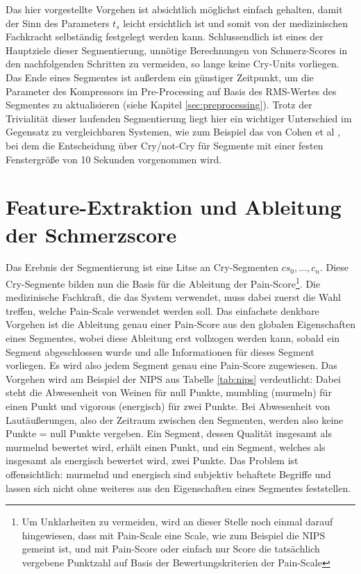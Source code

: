 Das hier vorgestellte Vorgehen ist absichtlich möglichst einfach gehalten, damit der Sinn des Parameters $t_{s}$ leicht ersichtlich ist und somit von der medizinischen Fachkracht selbständig festgelegt werden kann. Schlussendlich ist eines der Hauptziele dieser Segmentierung, unnötige Berechnungen von Schmerz-Scores in den nachfolgenden Schritten zu vermeiden, so lange keine Cry-Units vorliegen. Das Ende eines Segmentes ist außerdem ein günstiger Zeitpunkt, um die Parameter des Kompressors im Pre-Processing auf Basis des RMS-Wertes des Segmentes zu aktualisieren (siehe Kapitel \ref{sec:preprocessing}). Trotz der Trivialität dieser laufenden Segmentierung liegt hier ein wichtiger Unterschied im Gegensatz zu vergleichbaren Systemen, wie zum Beispiel das von Cohen et al \cite{cohenCry}, bei dem die Entscheidung über Cry/not-Cry für Segmente mit einer festen Fenstergröße von 10 Sekunden vorgenommen wird. 

\section{Feature-Extraktion und Ableitung der Schmerzscore}
\label{sec:overviewPainRegression}

Das Erebnis der Segmentierung ist eine Litse an Cry-Segmenten $cs_0,  \ldots , c_n$. Diese Cry-Segmente bilden nun die Basis für die Ableitung der Pain-Score\footnote{Um Unklarheiten zu vermeiden, wird an dieser Stelle noch einmal darauf hingewiesen, dass mit \glqq Pain-Scale\grqq{} eine Scale, wie zum Beispiel die NIPS gemeint ist, und mit \glqq Pain-Score\glqq{} oder einfach nur \glqq Score\grqq{} die tatsächlich vergebene Punktzahl auf Basis der Bewertungskriterien der Pain-Scale}. Die medizinische Fachkraft, die das System verwendet, muss dabei zuerst die Wahl treffen, welche Pain-Scale verwendet werden soll. Das einfachste denkbare Vorgehen ist die Ableitung genau einer Pain-Score aus den globalen Eigenschaften eines Segmentes, wobei diese Ableitung erst vollzogen werden kann, sobald ein Segment abgeschlossen wurde und alle Informationen für dieses Segment vorliegen. Es wird also jedem Segment genau eine Pain-Score zugewiesen. Das Vorgehen wird am Beispiel der NIPS aus Tabelle \ref{tab:nips} verdeutlicht: Dabei steht die Abwesenheit von Weinen für null Punkte, \glqq mumbling\grqq{} (murmeln) für einen Punkt und \glqq vigorous\grqq{} (energisch) für zwei Punkte. Bei Abwesenheit von Lautäußerungen, also der Zeitraum zwischen den Segmenten, werden also keine Punkte = null Punkte vergeben. Ein Segment, dessen Qualität insgesamt als \glqq murmelnd\grqq{} bewertet wird, erhält einen Punkt, und ein Segment, welches als insgesamt als \glqq energisch\grqq{} bewertet wird, zwei Punkte. Das Problem ist offensichtlich: \glqq murmelnd\grqq{} und \glqq energisch\grqq{} sind subjektiv behaftete Begriffe und lassen sich nicht ohne weiteres aus den Eigenschaften eines Segmentes feststellen. 

